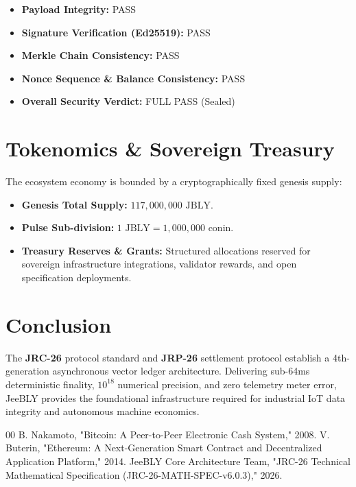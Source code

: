 \documentclass[10pt,journal,compsoc]{IEEEtran}
\begin{document}
\begin{itemize}
    \item \textbf{Payload Integrity:} PASS
    \item \textbf{Signature Verification (Ed25519):} PASS
    \item \textbf{Merkle Chain Consistency:} PASS
    \item \textbf{Nonce Sequence \& Balance Consistency:} PASS
    \item \textbf{Overall Security Verdict:} FULL PASS (Sealed)
\end{itemize}

\section{Tokenomics \& Sovereign Treasury}
The ecosystem economy is bounded by a cryptographically fixed genesis supply:
\begin{itemize}
    \item \textbf{Genesis Total Supply:} $117,000,000\text{ JBLY}$.
    \item \textbf{Pulse Sub-division:} $1\text{ JBLY} = 1,000,000\text{ conin}$.
    \item \textbf{Treasury Reserves \& Grants:} Structured allocations reserved for sovereign infrastructure integrations, validator rewards, and open specification deployments.
\end{itemize}

\section{Conclusion}
The \textbf{JRC-26} protocol standard and \textbf{JRP-26} settlement protocol establish a 4th-generation asynchronous vector ledger architecture. Delivering sub-64ms deterministic finality, $10^{18}$ numerical precision, and zero telemetry meter error, JeeBLY provides the foundational infrastructure required for industrial IoT data integrity and autonomous machine economics.

\begin{thebibliography}{00}
 B. Nakamoto, "Bitcoin: A Peer-to-Peer Electronic Cash System," 2008.
 V. Buterin, "Ethereum: A Next-Generation Smart Contract and Decentralized Application Platform," 2014.
 JeeBLY Core Architecture Team, "JRC-26 Technical Mathematical Specification (JRC-26-MATH-SPEC-v6.0.3)," 2026.
\end{thebibliography}
\end{document}
